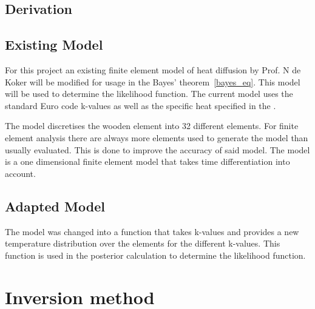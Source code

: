 	\subsection{Derivation}%
	
	\subsection{Existing Model}
	For this project an existing finite element model of heat diffusion by Prof. N de Koker will be modified for usage in the Bayes' theorem~\ref{bayes_eq}. 
	This model will be used to determine the likelihood function. 
	The current model uses the standard Euro code k-values as well as the specific heat specified in the \citep{Euro:2004}. 
	
	The model discretises the wooden element into 32 different elements. For finite element analysis there are always more elements used to generate the model than usually evaluated. This is done to improve the accuracy of said model.
	The model is a one dimensional finite element model that takes time differentiation into account.
	
	\subsection{Adapted Model}	
	The model was changed into a function that takes k-values and provides a new temperature distribution over the elements for the different k-values. 
	This function is used in the posterior calculation to determine the likelihood function.
	


\section{Inversion method}
